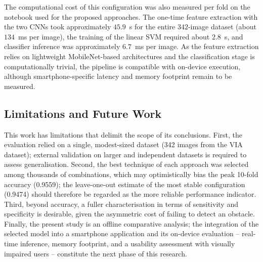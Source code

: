 \documentclass[final,5p,times,twocolumn]{elsarticle}
\begin{document}
The computational cost of this configuration was also measured per fold on the notebook used for the proposed approaches. The one-time feature extraction with the two CNNs took approximately $45.9$~s for the entire $342$-image dataset (about $134$~ms per image), the training of the linear SVM required about $2.8$~s, and classifier inference was approximately $6.7$~ms per image. As the feature extraction relies on lightweight MobileNet-based architectures and the classification stage is computationally trivial, the pipeline is compatible with on-device execution, although smartphone-specific latency and memory footprint remain to be measured.

\subsection*{Limitations and Future Work}
This work has limitations that delimit the scope of its conclusions. First, the evaluation relied on a single, modest-sized dataset (342 images from the VIA dataset); external validation on larger and independent datasets is required to assess generalisation. Second, the best technique of each approach was selected among thousands of combinations, which may optimistically bias the peak 10-fold accuracy (0.9559); the leave-one-out estimate of the most stable configuration (0.9474) should therefore be regarded as the more reliable performance indicator. Third, beyond accuracy, a fuller characterisation in terms of sensitivity and specificity is desirable, given the asymmetric cost of failing to detect an obstacle. Finally, the present study is an offline comparative analysis; the integration of the selected model into a smartphone application and its on-device evaluation -- real-time inference, memory footprint, and a usability assessment with visually impaired users -- constitute the next phase of this research.
\end{document}
